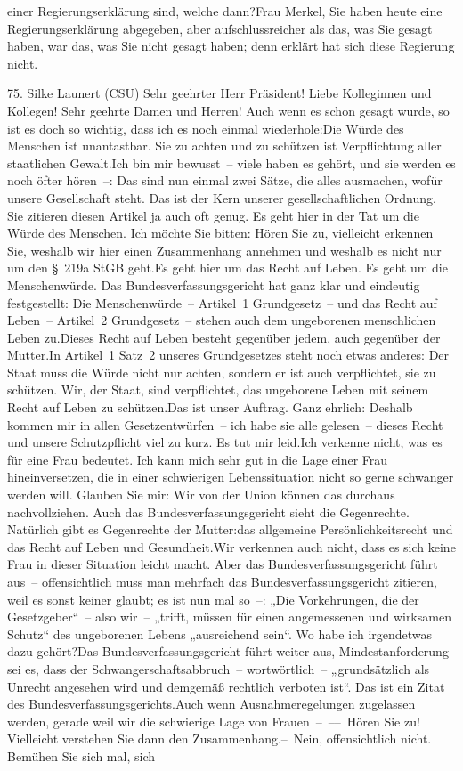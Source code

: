 \documentclass{article}
\begin{document}
einer Regierungserklärung sind, welche dann?Frau Merkel, Sie haben heute eine Regierungserklärung abgegeben, aber aufschlussreicher als das, was Sie gesagt haben, war das, was Sie nicht gesagt haben; denn erklärt hat sich diese Regierung nicht.




	75. Silke Launert (CSU) Sehr geehrter Herr Präsident! Liebe Kolleginnen und Kollegen! Sehr geehrte Damen und Herren! Auch wenn es schon gesagt wurde, so ist es doch so wichtig, dass ich es noch einmal wiederhole:Die Würde des Menschen ist unantastbar. Sie zu achten und zu schützen ist Verpflichtung aller staatlichen Gewalt.Ich bin mir bewusst – viele haben es gehört, und sie werden es noch öfter hören –: Das sind nun einmal zwei Sätze, die alles ausmachen, wofür unsere Gesellschaft steht. Das ist der Kern unserer gesellschaftlichen Ordnung. Sie zitieren diesen Artikel ja auch oft genug. Es geht hier in der Tat um die Würde des Menschen. Ich möchte Sie bitten: Hören Sie zu, vielleicht erkennen Sie, weshalb wir hier einen Zusammenhang annehmen und weshalb es nicht nur um den § 219a StGB geht.Es geht hier um das Recht auf Leben. Es geht um die Menschenwürde. Das Bundesverfassungsgericht hat ganz klar und eindeutig festgestellt: Die Menschenwürde – Artikel 1 Grundgesetz – und das Recht auf Leben – Artikel 2 Grundgesetz – stehen auch dem ungeborenen menschlichen Leben zu.Dieses Recht auf Leben besteht gegenüber jedem, auch gegenüber der Mutter.In Artikel 1 Satz 2 unseres Grundgesetzes steht noch etwas anderes: Der Staat muss die Würde nicht nur achten, sondern er ist auch verpflichtet, sie zu schützen. Wir, der Staat, sind verpflichtet, das ungeborene Leben mit seinem Recht auf Leben zu schützen.Das ist unser Auftrag. Ganz ehrlich: Deshalb kommen mir in allen Gesetzentwürfen – ich habe sie alle gelesen – dieses Recht und unsere Schutzpflicht viel zu kurz. Es tut mir leid.Ich verkenne nicht, was es für eine Frau bedeutet. Ich kann mich sehr gut in die Lage einer Frau hineinversetzen, die in einer schwierigen Lebenssituation nicht so gerne schwanger werden will. Glauben Sie mir: Wir von der Union können das durchaus nachvollziehen. Auch das Bundesverfassungsgericht sieht die Gegenrechte. Natürlich gibt es Gegenrechte der Mutter:das allgemeine Persönlichkeitsrecht und das Recht auf Leben und Gesundheit.Wir verkennen auch nicht, dass es sich keine Frau in dieser Situation leicht macht. Aber das Bundesverfassungsgericht führt aus – offensichtlich muss man mehrfach das Bundesverfassungsgericht zitieren, weil es sonst keiner glaubt; es ist nun mal so –: „Die Vorkehrungen, die der Gesetzgeber“ – also wir – „trifft, müssen für einen angemessenen und wirksamen Schutz“ des ungeborenen Lebens „ausreichend sein“. Wo habe ich irgendetwas dazu gehört?Das Bundesverfassungsgericht führt weiter aus, Mindestanforderung sei es, dass der Schwangerschaftsabbruch – wortwörtlich – „grundsätzlich als Unrecht angesehen wird und demgemäß rechtlich verboten ist“. Das ist ein Zitat des Bundesverfassungsgerichts.Auch wenn Ausnahmeregelungen zugelassen werden, gerade weil wir die schwierige Lage von Frauen – –– Hören Sie zu! Vielleicht verstehen Sie dann den Zusammenhang.– Nein, offensichtlich nicht. Bemühen Sie sich mal, sich 
\end{document}
